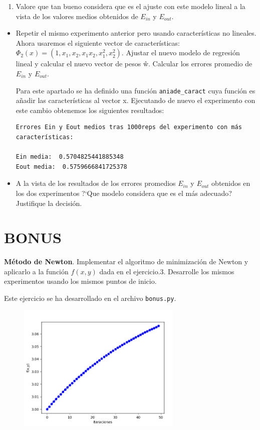 \documentclass[size=a4, parskip=half, titlepage=false, toc=flat, toc=bib, 12pt]{scrartcl}
\begin{document}
\begin{enumerate}
\begin{enumerate}
\item Valore que tan bueno considera que es el ajuste con este modelo lineal a la vista
de los valores medios obtenidos de $E_{in}$ y $E_{out}$.
\end{enumerate}
\begin{itemize}
\item Repetir el mismo experimento anterior pero usando características no lineales. Ahora
usaremos el siguiente vector de características: $\Phi_2 (x) = (1, x_1 , x_2 , x_1 x_2 , x^2_1 , x_2^2 )$. Ajustar
el nuevo modelo de regresión lineal y calcular el nuevo vector de pesos ŵ. Calcular
los errores promedio de $E_{in}$ y $E _{out}$.

Para este apartado se ha definido una función \verb|aniade_caract| cuya función es añadir
las características al vector x. Ejecutando de nuevo el experimento con este cambio obtenemos
los siguientes resultados:

\begin{lstlisting}
Errores Ein y Eout medios tras 1000reps del experimento con más características:

Ein media:  0.5704825441885348
Eout media:  0.5759666841725378
\end{lstlisting}

\item A la vista de los resultados de los errores promedios $E_{in}$ y $E_{out}$ obtenidos en los dos
experimentos ?`Que modelo considera que es el más adecuado? Justifique la decisión.

\end{itemize}
\end{enumerate}

\section{BONUS}

\textbf{Método de Newton}. Implementar el algoritmo de minimización de Newton
y aplicarlo a la función $f (x, y)$ dada en el ejercicio.3. Desarrolle los mismos experimentos
usando los mismos puntos de inicio.

Este ejercicio se ha desarrollado en el archivo \verb|bonus.py|.

\begin{figure}[H]
\centering
\includegraphics[width=0.7\textwidth]{./img/bonus21}
\end{figure}
\end{document}
